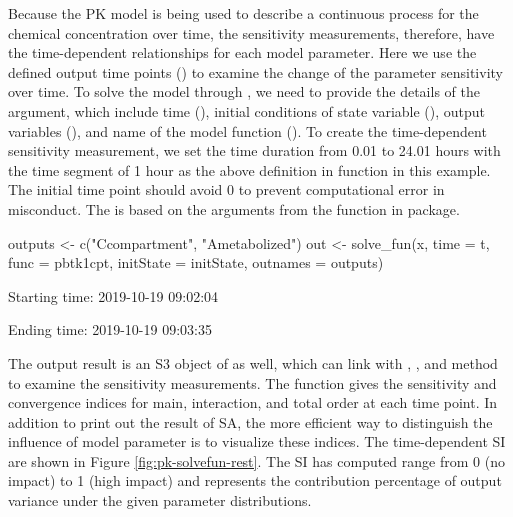 Because the PK model is being used to describe a continuous process for
the chemical concentration over time, the sensitivity measurements,
therefore, have the time-dependent relationships for each model
parameter. Here we use the defined output time points () to
examine the change of the parameter sensitivity over time. To solve the
model through , we need to provide the details of the
argument, which include time (), initial conditions of state
variable (), output variables (), and
name of the model function (). To create the time-dependent
sensitivity measurement, we set the time duration from 0.01 to 24.01
hours with the time segment of 1 hour as the above definition in
 function in this example. The initial time point should avoid
0 to prevent computational error in misconduct. The  is
based on the arguments from the  function in 
package.

\begin{Schunk}
\begin{Sinput}
outputs <- c("Ccompartment", "Ametabolized")
out <- solve_fun(x, time = t, func = pbtk1cpt, 
                 initState = initState, outnames = outputs)
\end{Sinput}
\begin{Soutput}
  Starting time: 2019-10-19 09:02:04
\end{Soutput}
\begin{Soutput}
  Ending time: 2019-10-19 09:03:35
\end{Soutput}
\end{Schunk}

The output result  is an S3 object of  as well,
which can link with , , and  method
to examine the sensitivity measurements. The  function gives
the sensitivity and convergence indices for main, interaction, and total
order at each time point. In addition to print out the result of SA, the
more efficient way to distinguish the influence of model parameter is to
visualize these indices. The time-dependent SI are shown in Figure
\ref{fig:pk-solvefun-rest}. The SI has computed range from 0 (no impact)
to 1 (high impact) and represents the contribution percentage of output
variance under the given parameter distributions.

